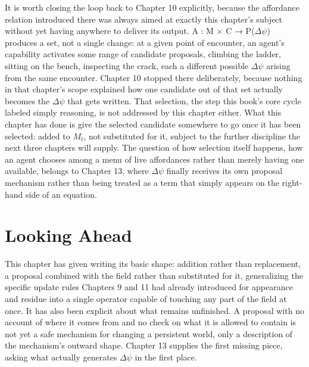 It is worth closing the loop back to Chapter 10 explicitly, because the affordance relation introduced there was always aimed at exactly this chapter's subject without yet having anywhere to deliver its output. A : M × C → P(\(\Delta\psi\)) produces a set, not a single change: at a given point of encounter, an agent's capability activates some range of candidate proposals, climbing the ladder, sitting on the bench, inspecting the crack, each a different possible \(\Delta\psi\) arising from the same encounter. Chapter 10 stopped there deliberately, because nothing in that chapter's scope explained how one candidate out of that set actually becomes the \(\Delta\psi\) that gets written. That selection, the step this book's core cycle labeled simply reasoning, is not addressed by this chapter either. What this chapter has done is give the selected candidate somewhere to go once it has been selected: added to \(M_t\), not substituted for it, subject to the further discipline the next three chapters will supply. The question of how selection itself happens, how an agent chooses among a menu of live affordances rather than merely having one available, belongs to Chapter 13, where \(\Delta\psi\) finally receives its own proposal mechanism rather than being treated as a term that simply appears on the right-hand side of an equation.

\section{Looking Ahead}

This chapter has given writing its basic shape: addition rather than replacement, a proposal combined with the field rather than substituted for it, generalizing the specific update rules Chapters 9 and 11 had already introduced for appearance and residue into a single operator capable of touching any part of the field at once. It has also been explicit about what remains unfinished. A proposal with no account of where it comes from and no check on what it is allowed to contain is not yet a safe mechanism for changing a persistent world, only a description of the mechanism's outward shape. Chapter 13 supplies the first missing piece, asking what actually generates \(\Delta\psi\) in the first place.
